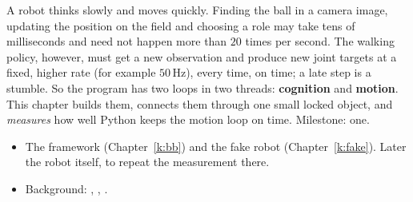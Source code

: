 \label{k:loops}

A robot thinks slowly and moves quickly. Finding the ball in a camera image, updating the position on the field and choosing a role may take tens of milliseconds and need not happen more than $20$ times per second. The walking policy, however, must get a new observation and produce new joint targets at a fixed, higher rate (for example $50$\,Hz), every time, on time; a late step is a stumble. So the program has two loops in two threads: \textbf{cognition} and \textbf{motion}. This chapter builds them, connects them through one small locked object, and \emph{measures} how well Python keeps the motion loop on time. Milestone: one.

\begin{needbox}
\begin{itemize}[nosep]
  \item The framework (Chapter~\ref{k:bb}) and the fake robot (Chapter~\ref{k:fake}). Later the robot itself, to repeat the measurement there.
  \item Background: , , .
\end{itemize}
\end{needbox}

